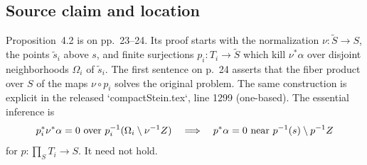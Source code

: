 \documentclass[10pt]{article}
\begin{document}
\subsection*{Source claim and location}
Proposition 4.2 is on pp. 23–24. Its proof starts with the normalization \(\nu:\widetilde S\to S\), the points \(\widetilde s_i\) above \(s\), and finite surjections \(p_i:T_i\to\widetilde S\) which kill \(\nu^*\alpha\) over disjoint neighborhoods \(\Omega_i\) of \(\widetilde s_i\). The first sentence on p. 24 asserts that the fiber product over \(S\) of the maps \(\nu\circ p_i\) solves the original problem. The same construction is explicit in the released `compactStein.tex`, line 1299 (one-based). The essential inference is \[p_i^*\nu^*\alpha=0\ \hbox{over }p_i^{-1}(\Omega_i\setminus\nu^{-1}Z)
 \quad\Longrightarrow\quad
 p^*\alpha=0\ \hbox{near }p^{-1}(s)\setminus p^{-1}Z\] for \(p:\prod_S T_i\to S\). It need not hold.\par
\end{document}
